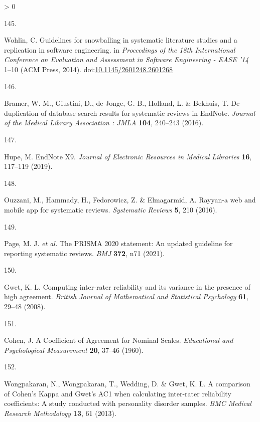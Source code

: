 \documentclass[a4paper, twoside]{templates/ociamthesis}
\newlength{\cslhangindent}
\newlength{\csllabelwidth}
\newenvironment{CSLReferences}[3] %
 {%
  \setlength{\parindent}{0pt}
  \ifodd #1 \everypar{\setlength{\hangindent}{\cslhangindent}}\ignorespaces\fi
  \ifnum #2 > 0
  \setlength{\parskip}{#2\baselineskip}
  \fi
 }%
 {}
\newcommand{\CSLLeftMargin}[1]{\parbox[t]{\maxof{\widthof{#1}}{\csllabelwidth}}{#1}}
\newcommand{\CSLRightInline}[1]{\parbox[t]{\linewidth - \csllabelwidth}{#1}}
\begin{document}
\begin{CSLReferences}{0}{0}
\leavevmode\hypertarget{ref-wohlin2014}{}%
\CSLLeftMargin{145. }
\CSLRightInline{Wohlin, C. Guidelines for snowballing in systematic literature studies and a replication in software engineering. in \emph{Proceedings of the 18th {International Conference} on {Evaluation} and {Assessment} in {Software Engineering} - {EASE} '14} 1--10 ({ACM Press}, 2014). doi:\href{https://doi.org/10.1145/2601248.2601268}{10.1145/2601248.2601268}}

\leavevmode\hypertarget{ref-bramer2016}{}%
\CSLLeftMargin{146. }
\CSLRightInline{Bramer, W. M., Giustini, D., de Jonge, G. B., Holland, L. \& Bekhuis, T. De-duplication of database search results for systematic reviews in {EndNote}. \emph{Journal of the Medical Library Association : JMLA} \textbf{104}, 240--243 (2016).}

\leavevmode\hypertarget{ref-hupe2019}{}%
\CSLLeftMargin{147. }
\CSLRightInline{Hupe, M. {EndNote X9}. \emph{Journal of Electronic Resources in Medical Libraries} \textbf{16}, 117--119 (2019).}

\leavevmode\hypertarget{ref-ouzzani2016}{}%
\CSLLeftMargin{148. }
\CSLRightInline{Ouzzani, M., Hammady, H., Fedorowicz, Z. \& Elmagarmid, A. Rayyan-a web and mobile app for systematic reviews. \emph{Systematic Reviews} \textbf{5}, 210 (2016).}

\leavevmode\hypertarget{ref-page2021}{}%
\CSLLeftMargin{149. }
\CSLRightInline{Page, M. J. \emph{et al.} The {PRISMA} 2020 statement: An updated guideline for reporting systematic reviews. \emph{BMJ} \textbf{372}, n71 (2021).}

\leavevmode\hypertarget{ref-gwet2008}{}%
\CSLLeftMargin{150. }
\CSLRightInline{Gwet, K. L. Computing inter-rater reliability and its variance in the presence of high agreement. \emph{British Journal of Mathematical and Statistical Psychology} \textbf{61}, 29--48 (2008).}

\leavevmode\hypertarget{ref-cohen1960}{}%
\CSLLeftMargin{151. }
\CSLRightInline{Cohen, J. A {Coefficient} of {Agreement} for {Nominal Scales}. \emph{Educational and Psychological Measurement} \textbf{20}, 37--46 (1960).}

\leavevmode\hypertarget{ref-wongpakaran2013}{}%
\CSLLeftMargin{152. }
\CSLRightInline{Wongpakaran, N., Wongpakaran, T., Wedding, D. \& Gwet, K. L. A comparison of {Cohen}'s {Kappa} and {Gwet}'s {AC1} when calculating inter-rater reliability coefficients: A study conducted with personality disorder samples. \emph{BMC Medical Research Methodology} \textbf{13}, 61 (2013).}


\end{CSLReferences}
\end{document}
